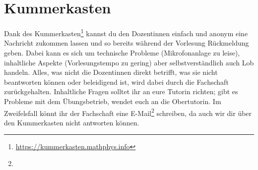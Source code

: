 \section{Kummerkasten}
\label{kummerkasten}

Dank des Kummerkasten\footnote{\url{https://kummerkasten.mathphys.info}} kannst du den Dozentinnen einfach und anonym eine Nachricht zukommen lassen und so bereits während der Vorlesung Rückmeldung geben. Dabei kann es sich um technische Probleme (Mikrofonanlage zu leise), inhaltliche Aspekte (Vorlesungstempo zu gering) aber selbstverständlich auch Lob handeln. Alles, was nicht die Dozentinnen direkt betrifft, was sie nicht beantworten können oder beleidigend ist, wird dabei durch die Fachschaft zurückgehalten. Inhaltliche Fragen solltet ihr an eure Tutorin richten; gibt es Probleme mit dem Übungsbetrieb, wendet euch an die Obertutorin. Im Zweifelsfall könnt ihr der Fachschaft eine E-Mail\footnote{} schreiben, da auch wir dir über den Kummerkasten nicht antworten können.

